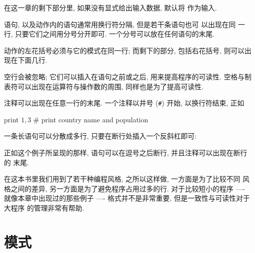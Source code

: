 在这一章的剩下部分里, 如果没有显式给出输入数据, 默认将 
作为输入.


\patact 语句, 以及动作内的语句通常用换行符分隔, 但是若干条语句也可
以出现在同
一行, 只要它们之间用分号分开即可. 一个分号可以放在任何语句的末尾.

动作的左花括号必须与它的模式在同一行; 而剩下的部分, 包括右花括号, 则可以出
现在下面几行.

空行会被忽略; 它们可以插入在语句之前或之后, 用来提高程序的可读性. 空格与制
表符可以出现在运算符与操作数的周围, 同样也是为了提高可读性.

注释可以出现在任意一行的末尾. 一个注释以井号 (\verb'#') 开始,
以换行符结束, 正如
\begin{awkcode}
    { print $1, $3 }    # print country name and population
\end{awkcode}

一条长语句可以分散成多行, 只要在断行处插入一个反斜杠即可:
正如这个例子所呈现的那样, 语句可以在逗号之后断行, 并且注释可以出现在断行的
末尾.

在这本书里我们用到了若干种编程风格, 之所以这样做, 一方面是为了比较不同
风格之间的差异, 另一方面是为了避免程序占用过多的行. 对于比较短小的程序
---- 就像本章中出现过的那些例子 ----
格式并不是非常重要, 但是一致性与可读性对于大程序
的管理非常有帮助.

\section{模式}
\label{sec:patterns}


